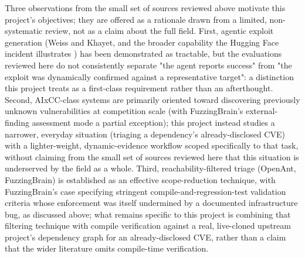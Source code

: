 \documentclass[12pt,a4paper]{report}
\begin{document}
Three observations from the small set of sources reviewed above motivate this project's objectives; they are offered as a rationale drawn from a limited, non-systematic review, not as a claim about the full field. First, agentic exploit generation (Weiss and Khayet, and the broader capability the Hugging Face incident illustrates \cite{openai-incident}) has been demonstrated as tractable, but the evaluations reviewed here do not consistently separate "the agent reports success" from "the exploit was dynamically confirmed against a representative target": a distinction this project treats as a first-class requirement rather than an afterthought. Second, AIxCC-class systems are primarily oriented toward discovering previously unknown vulnerabilities at competition scale (with FuzzingBrain's external-finding assessment mode a partial exception); this project instead studies a narrower, everyday situation (triaging a dependency's already-disclosed CVE) with a lighter-weight, dynamic-evidence workflow scoped specifically to that task, without claiming from the small set of sources reviewed here that this situation is underserved by the field as a whole. Third, reachability-filtered triage (OpenAnt, FuzzingBrain) is established as an effective scope-reduction technique, with FuzzingBrain's case specifying stringent compile-and-regression-test validation criteria whose enforcement was itself undermined by a documented infrastructure bug, as discussed above; what remains specific to this project is combining that filtering technique with compile verification against a real, live-cloned upstream project's dependency graph for an already-disclosed CVE, rather than a claim that the wider literature omits compile-time verification.
\end{document}
